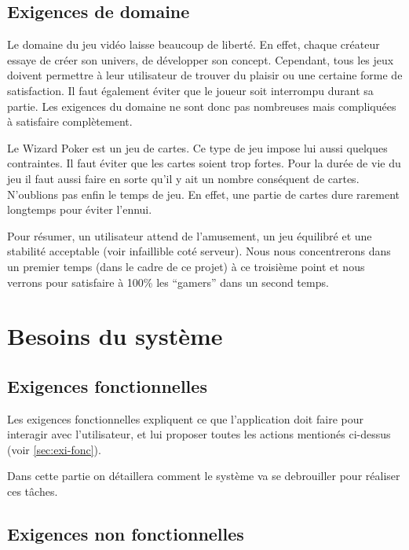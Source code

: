 \documentclass[11pt,a4paper]{article}
\begin{document}
\subsection{Exigences de domaine}
\label{sec:exi-dom}

Le domaine du jeu vidéo laisse beaucoup de liberté.  En effet, chaque créateur essaye de créer son univers, de développer son concept.  Cependant, tous les jeux doivent permettre à leur utilisateur de trouver du plaisir ou une certaine forme de satisfaction.  Il faut également éviter que le joueur soit interrompu durant sa partie.  Les exigences du domaine ne sont donc pas nombreuses mais compliquées à satisfaire complètement.

Le Wizard Poker est un jeu de cartes.  Ce type de jeu impose lui aussi quelques contraintes.  Il faut éviter que les cartes soient trop fortes.  Pour la durée de vie du jeu il faut aussi faire en sorte qu'il y ait un nombre conséquent de cartes.  N'oublions pas enfin le temps de jeu.  En effet, une partie de cartes dure rarement longtemps pour éviter l'ennui.

Pour résumer, un utilisateur attend de l'amusement, un jeu équilibré et une stabilité acceptable (voir infaillible coté serveur).  Nous nous concentrerons dans un premier temps (dans le cadre de ce projet) à ce troisième point et nous verrons pour satisfaire à 100\% les ``gamers'' dans un second temps.



\section{Besoins du système}
\label{sec:besoins-sys}

\subsection{Exigences fonctionnelles}
\label{sec:exi-fonc-sys}

Les exigences fonctionnelles expliquent ce que l'application doit
faire pour interagir avec l'utilisateur, et lui proposer toutes les
actions mentionés ci-dessus (voir \ref{sec:exi-fonc}).

Dans cette partie on détaillera comment le système va se debrouiller
pour réaliser ces tâches.


\subsection{Exigences non fonctionnelles}
\label{sec:exi-nonfonc-sys}
\end{document}
